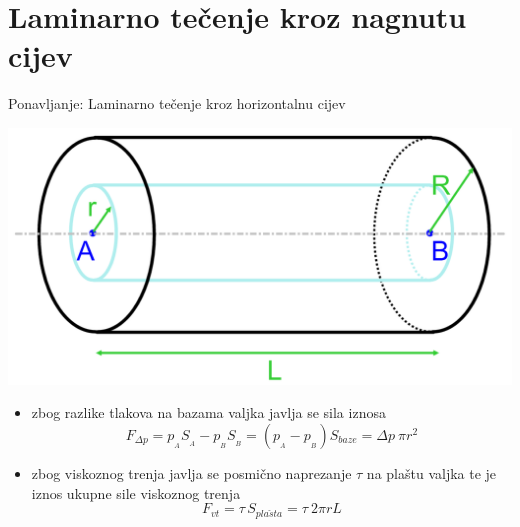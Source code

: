 \documentclass[croatian]{beamer}
\begin{document}
\naslovnislajd

\section{Laminarno tečenje kroz nagnutu cijev}

\begin{frame}{Ponavljanje: Laminarno tečenje kroz horizontalnu cijev}

\begin{center}
\includegraphics[width=0.5\paperwidth]{slike/slika1.PNG}
\end{center}
\begin{itemize}
\item zbog razlike tlakova na bazama valjka javlja se sila iznosa
\[
F_{\Delta p}=p_{_{A}}S_{_{A}}-p_{_{B}}S_{_{B}}=(p_{_{A}}-p_{_{B}})S_{baze}=\Delta p\:\pi r^{2}
\]
\item zbog viskoznog trenja javlja se posmično naprezanje $\tau$ na plaštu
valjka te je iznos ukupne sile viskoznog trenja
\[
F_{vt}=\tau\,S_{pla\check{s}ta}=\tau\:2\pi rL
\]
\end{itemize}
\end{frame}
\end{document}
